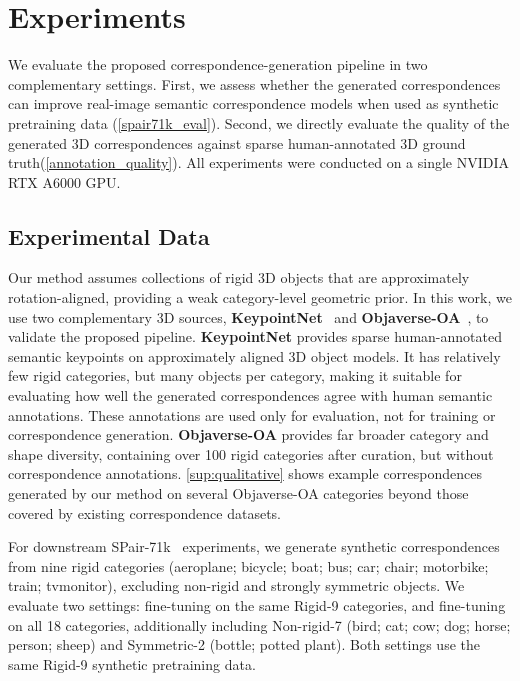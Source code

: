 \section{Experiments}\label{sec:experiments}

We evaluate the proposed correspondence-generation pipeline in two complementary settings. First, we assess whether the generated correspondences can improve real-image semantic correspondence models when used as synthetic pretraining data (\autoref{spair71k_eval}). Second, we directly evaluate the quality of the generated 3D correspondences against sparse human-annotated 3D ground truth(\autoref{annotation_quality}).
All experiments were conducted on a single NVIDIA RTX A6000 GPU.

\subsection{Experimental Data}
\label{sec:exp_data}

Our method assumes collections of rigid 3D objects that are approximately rotation-aligned, providing a weak category-level geometric prior. In this work, we use two complementary 3D sources, 
\textbf{KeypointNet}~\cite{you2020} and \textbf{Objaverse-OA}~\cite{lu2025orientationmatters}, 
to validate the proposed pipeline. 
%
% 
\textbf{KeypointNet} provides sparse human-annotated semantic keypoints on approximately aligned 3D object models. It has relatively few rigid categories, but many objects per category, making it suitable for evaluating how well the generated correspondences  agree with human semantic annotations. These annotations are used only for evaluation, not for training or correspondence generation.
%
%
\textbf{Objaverse-OA} provides far broader category and shape diversity, containing over 100 rigid categories after curation, but without correspondence annotations. \autoref{sup:qualitative}  shows example correspondences generated by our method on several Objaverse-OA categories beyond those covered by existing correspondence datasets.
%


For downstream SPair-71k~\cite{min2019spair71k} experiments,
we generate synthetic correspondences from nine rigid categories
(aeroplane; bicycle; boat; bus; car; chair; motorbike; train; tvmonitor), excluding non-rigid and strongly symmetric objects.
We evaluate two settings: fine-tuning on the same Rigid-9 categories,
and fine-tuning on all 18 categories, additionally including
Non-rigid-7 (bird; cat; cow; dog; horse; person; sheep)
and Symmetric-2 (bottle; potted plant).
Both settings use the same Rigid-9 synthetic pretraining data.


